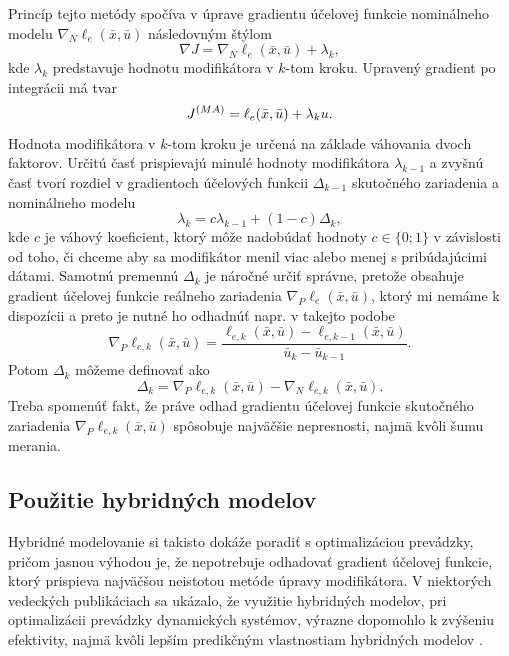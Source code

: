 Princíp tejto metódy spočíva v úprave gradientu účelovej funkcie nominálneho modelu $ \nabla_N\ell_e(\bar{x},\bar{u}) $ následovným štýlom
\begin{equation}
	\nabla J = \nabla_N\ell_e(\bar{x},\bar{u}) + \lambda_k,
\end{equation}
kde $ \lambda_k $ predstavuje hodnotu modifikátora v $ k $-tom kroku. Upravený gradient po integrácii má tvar 
\begin{equation}
	J^{\tiny{(MA)}} = \ell_e(\bar{x},\bar{u}) + \lambda_ku.
\end{equation}
Hodnota modifikátora v $ k $-tom kroku je určená na základe váhovania dvoch faktorov. Určitú časť prispievajú minulé hodnoty modifikátora $ \lambda_{k-1} $ a zvyšnú časť tvorí rozdiel v gradientoch účelových funkcii $ \Delta_{k-1} $ skutočného zariadenia a nominálneho modelu 
\begin{equation}
	\label{eq:mas_weight}
	\lambda_k = c\lambda_{k-1} + \left(1 - c\right)\Delta_{k},
\end{equation}
kde $ c $ je váhový koeficient, ktorý môže nadobúdať hodnoty $ c \in \lbrace 0; 1 \rbrace $ v závislosti od toho, či chceme aby sa modifikátor menil viac alebo menej s pribúdajúcimi dátami.
Samotnú premennú $ \Delta_k $ je náročné určiť správne, pretože obsahuje gradient účelovej funkcie reálneho zariadenia $ \nabla_P\ell_e(\bar{x},\bar{u}) $, ktorý
mi nemáme k dispozícii a preto je nutné ho odhadnúť napr. v takejto podobe
\begin{equation}
	\nabla_P\ell_{e,k}(\bar{x},\bar{u}) = \frac{\ell_{e,k}(\bar{x},\bar{u}) - \ell_{e,k-1}(\bar{x},\bar{u})}{\bar{u}_k - \bar{u}_{k-1}}.
\end{equation} 
Potom $ \Delta_k $ môžeme definovať ako 
\begin{equation}
	\label{eq:mas_correction}
	\Delta_k = \nabla_P\ell_{e,k}(\bar{x},\bar{u}) - \nabla_N\ell_{e,k}(\bar{x},\bar{u}).
\end{equation}
Treba spomenúť fakt, že práve odhad gradientu účelovej funkcie skutočného zariadenia $ \nabla_P\ell_{e,k}(\bar{x},\bar{u}) $ spôsobuje najväčšie nepresnosti, najmä kvôli šumu merania. 

\subsection{Použitie hybridných modelov}
Hybridné modelovanie si takisto dokáže poradiť s optimalizáciou prevádzky, pričom jasnou výhodou je, že nepotrebuje odhadovať gradient účelovej funkcie, ktorý prispieva najväčšou neistotou metóde úpravy modifikátora. V niektorých vedeckých publikáciach sa ukázalo, že využitie hybridných modelov, pri optimalizácii prevádzky dynamických systémov, výrazne dopomohlo k zvýšeniu efektivity, najmä kvôli lepším predikčným vlastnostiam hybridných modelov \cite{bhutani:hybrid_modelling_opt:2006}. 

